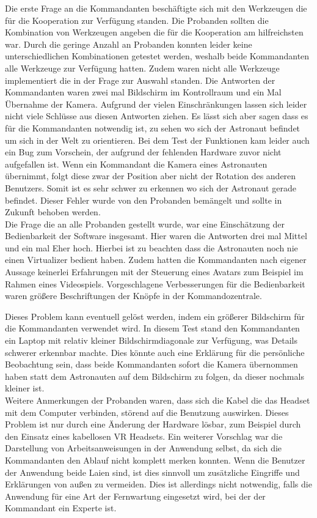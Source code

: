 Die erste Frage an die Kommandanten beschäftigte sich mit den Werkzeugen die für die Kooperation zur Verfügung standen. Die Probanden sollten die Kombination von Werkzeugen angeben die für die Kooperation am hilfreichsten war. Durch die geringe Anzahl an Probanden konnten leider keine unterschiedlichen Kombinationen getestet werden, weshalb beide Kommandanten alle Werkzeuge zur Verfügung hatten. Zudem waren nicht alle Werkzeuge implementiert die in der Frage zur Auswahl standen. Die Antworten der Kommandanten waren zwei mal \glqq Bildschirm im Kontrollraum\grqq{} und ein Mal \glqq Übernahme der Kamera\grqq{}. Aufgrund der vielen Einschränkungen lassen sich leider nicht viele Schlüsse aus diesen Antworten ziehen. Es lässt sich aber sagen dass es für die Kommandanten notwendig ist, zu sehen wo sich der Astronaut befindet um sich in der Welt zu orientieren. Bei dem Test der Funktionen kam leider auch ein Bug zum Vorschein, der aufgrund der fehlenden Hardware zuvor nicht aufgefallen ist. Wenn ein Kommandant die Kamera eines Astronauten übernimmt, folgt diese zwar der Position aber nicht der Rotation des anderen Benutzers. Somit ist es sehr schwer zu erkennen wo sich der Astronaut gerade befindet. Dieser Fehler wurde von den Probanden bemängelt und sollte in Zukunft behoben werden.\\

Die Frage die an alle Probanden gestellt wurde, war eine Einschätzung der Bedienbarkeit der Software insgesamt. Hier waren die Antworten drei mal \glqq Mittel\grqq{} und ein mal \glqq Eher hoch\grqq{}. Hierbei ist zu beachten dass die Astronauten noch nie einen Virtualizer bedient haben. Zudem hatten die Kommandanten nach eigener Aussage keinerlei Erfahrungen mit der Steuerung eines Avatars zum Beispiel im Rahmen eines Videospiels. Vorgeschlagene Verbesserungen für die Bedienbarkeit waren größere Beschriftungen der Knöpfe in der Kommandozentrale. 

\newpage

Dieses Problem kann eventuell gelöst werden, indem ein größerer Bildschirm für die Kommandanten verwendet wird. In diesem Test stand den Kommandanten ein Laptop mit relativ kleiner Bildschirmdiagonale zur Verfügung, was Details schwerer erkennbar machte. Dies könnte auch eine Erklärung für die persönliche Beobachtung sein, dass beide Kommandanten sofort die Kamera übernommen haben statt dem Astronauten auf dem Bildschirm zu folgen, da dieser nochmals kleiner ist.\\

Weitere Anmerkungen der Probanden waren, dass sich die Kabel die das Headset mit dem Computer verbinden, störend auf die Benutzung auswirken. Dieses Problem ist nur durch eine Änderung der Hardware lösbar, zum Beispiel durch den Einsatz eines kabellosen VR Headsets. Ein weiterer Vorschlag war die Darstellung von Arbeitsanweisungen in der Anwendung selbst, da sich die Kommandanten den Ablauf nicht komplett merken konnten. Wenn die Benutzer der Anwendung beide Laien sind, ist dies sinnvoll um zusätzliche Eingriffe und Erklärungen von außen zu vermeiden. Dies ist allerdings nicht notwendig, falls die Anwendung für eine Art der Fernwartung eingesetzt wird, bei der der Kommandant ein Experte ist.\\


